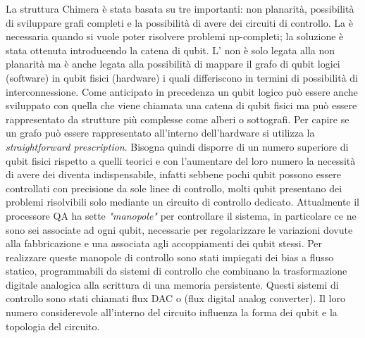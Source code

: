 La struttura Chimera è stata basata su tre  importanti: non planarità, possibilità di sviluppare grafi completi e la possibilità di avere dei circuiti di controllo. La  è necessaria quando si vuole poter risolvere problemi np-completi; la soluzione è stata ottenuta introducendo la catena di qubit. L' non è solo legata alla non planarità ma è anche legata alla possibilità di mappare il grafo di qubit logici (software) in qubit fisici (hardware) i quali differiscono in termini di possibilità di interconnessione. Come anticipato in precedenza un qubit logico può essere anche sviluppato con quella che viene chiamata una catena di qubit fisici ma può essere rappresentato da strutture più complesse come alberi o sottografi. Per capire se un grafo può essere rappresentato all'interno dell'hardware si utilizza la \textit{straightforward prescription}. Bisogna quindi disporre di un numero superiore di qubit fisici rispetto a quelli teorici e con l'aumentare del loro numero la necessità di avere dei  diventa indispensabile, infatti sebbene pochi qubit possono essere controllati con precisione da sole linee di controllo, molti qubit presentano dei problemi risolvibili solo mediante un circuito di controllo dedicato. Attualmente il processore QA ha sette \textit{"manopole"} per controllare il sistema, in particolare ce ne sono sei associate ad ogni qubit, necessarie per regolarizzare le variazioni dovute alla fabbricazione e una associata agli accoppiamenti dei qubit stessi. Per realizzare queste manopole di controllo sono stati impiegati dei bias a flusso statico, programmabili da sistemi di controllo che combinano la trasformazione digitale analogica alla scrittura di una memoria persistente. Questi sistemi di controllo sono stati chiamati flux DAC o  (flux digital analog converter). Il loro numero considerevole all'interno del circuito influenza la forma dei qubit e la topologia del circuito.

